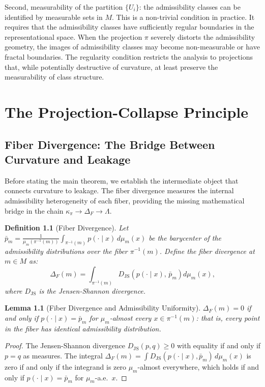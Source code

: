 \documentclass[12pt, oneside]{book}
\theoremstyle{plain-flyxion}
\newtheorem{lemma}[theorem]{Lemma}
\theoremstyle{definition-flyxion}
\newtheorem{definition}[theorem]{Definition}
\newcommand{\kpi}{\kappa_{\pi}}
\newcommand{\Lam}{\Lambda}
\begin{document}
Second, measurability of the partition $\{U_i\}$: the admissibility classes can be
identified by measurable sets in $M$. This is a non-trivial condition in practice. It
requires that the admissibility classes have sufficiently regular boundaries in the
representational space. When the projection $\pi$ severely distorts the admissibility
geometry, the images of admissibility classes may become non-measurable or have fractal
boundaries. The regularity condition restricts the analysis to projections that, while
potentially destructive of curvature, at least preserve the measurability of class
structure.

\chapter{The Projection-Collapse Principle}

\section{Fiber Divergence: The Bridge Between Curvature and Leakage}

Before stating the main theorem, we establish the intermediate object that connects
curvature to leakage. The fiber divergence measures the internal admissibility
heterogeneity of each fiber, providing the missing mathematical bridge in the chain
$\kpi \to \Delta_F \to \Lam$.

\begin{definition}[Fiber Divergence]\label{def:fiber-div}
Let $\bar{p}_m = \frac{1}{\mu_m(\pi^{-1}(m))}\int_{\pi^{-1}(m)} p(\cdot \mid x)\,
d\mu_m(x)$ be the barycenter of the admissibility distributions over the fiber
$\pi^{-1}(m)$. Define the \emph{fiber divergence} at $m \in M$ as:
\begin{equation}\label{eq:fiber-div}
\Delta_F(m) = \int_{\pi^{-1}(m)}
D_{\mathrm{JS}}\!\left(p(\cdot \mid x),\, \bar{p}_m\right) d\mu_m(x),
\end{equation}
where $D_{\mathrm{JS}}$ is the Jensen-Shannon divergence.
\end{definition}

\begin{lemma}[Fiber Divergence and Admissibility Uniformity]\label{lem:fiber-div}
$\Delta_F(m) = 0$ if and only if $p(\cdot \mid x) = \bar{p}_m$ for $\mu_m$-almost
every $x \in \pi^{-1}(m)$: that is, every point in the fiber has identical admissibility
distribution.
\end{lemma}

\begin{proof}
The Jensen-Shannon divergence $D_{\mathrm{JS}}(p, q) \geq 0$ with equality if and only
if $p = q$ as measures. The integral $\Delta_F(m) = \int D_{\mathrm{JS}}(p(\cdot\mid
x), \bar{p}_m)\, d\mu_m(x)$ is zero if and only if the integrand is zero $\mu_m$-almost
everywhere, which holds if and only if $p(\cdot \mid x) = \bar{p}_m$ for $\mu_m$-a.e.\
$x$.
\end{proof}
\end{document}
